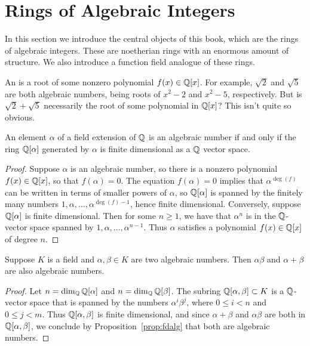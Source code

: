 \section{Rings of Algebraic Integers}

In this section we introduce the central objects of this book, which
are the rings of algebraic integers.  These are noetherian rings with
an enormous amount of structure.  We also introduce a function field
analogue of these rings.


An  is a root of some nonzero polynomial $f(x) \in \mathbb{Q}[x]$.
For example, $\sqrt{2}$ and $\sqrt{5}$ are both algebraic numbers, being
roots of $x^2-2$ and $x^2-5$, respectively.
But is $\sqrt{2} + \sqrt{5}$ necessarily the root of some polynomial in $\mathbb{Q}[x]$?
This isn't quite so obvious.

\begin{proposition}\label{prop:fdalg}
	An element $\alpha$ of a field extension of $\mathbb{Q}$ is an
	algebraic number if and only if the ring $\mathbb{Q}[\alpha]$
	generated by $\alpha$ is finite dimensional as a $\mathbb{Q}$ vector
	space.
\end{proposition}
\begin{proof}
	Suppose $\alpha$ is an algebraic number, so there is a nonzero
	polynomial $f(x)\in\mathbb{Q}[x]$, so that $f(\alpha)=0$. The equation
	$f(\alpha)=0$ implies that $\alpha^{\deg(f)}$ can be written in
	terms of smaller powers of $\alpha$, so $\mathbb{Q}[\alpha]$ is spanned
	by the finitely many numbers $1,\alpha,\ldots,\alpha^{\deg(f)-1}$,
	hence finite dimensional. Conversely, suppose $\mathbb{Q}[\alpha]$ is finite
	dimensional.  Then for some $n\geq 1$, we have that $\alpha^n$ is in
	the $\mathbb{Q}$-vector space spanned by $1,\alpha,\ldots, \alpha^{n-1}$.
	Thus $\alpha$ satisfies a polynomial $f(x) \in \mathbb{Q}[x]$ of degree $n$.
\end{proof}

\begin{proposition}\label{prop:algnumfield}
	Suppose $K$ is a field and $\alpha, \beta\in K$ are two
	algebraic numbers. Then $\alpha\beta$ and $\alpha+\beta$
	are also algebraic numbers.
\end{proposition}
\begin{proof}
	Let $n = \dim_{\mathbb{Q}} \mathbb{Q}[\alpha]$ and $n = \dim_{\mathbb{Q}} \mathbb{Q}[\beta]$.
	The subring $\mathbb{Q}[\alpha,\beta]\subset K$ is a
	$\mathbb{Q}$-vector space that is spanned by the numbers $\alpha^i\beta^j$,
	where $0\leq i<n$ and $0\leq j<m$. Thus
	$\mathbb{Q}[\alpha,\beta]$ is finite dimensional, and since $\alpha+\beta$
	and $\alpha\beta$ are both in $\mathbb{Q}[\alpha,\beta]$, we conclude by Proposition~\ref{prop:fdalg} that both are algebraic numbers.
\end{proof}

